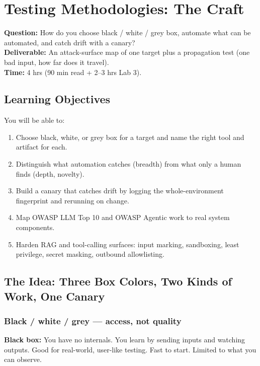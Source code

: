 \chapter{Testing Methodologies: The Craft}
\label{ch:3}

\begin{tcolorbox}[colback=white,colframe=checkblack,title=Chapter 3 at a Glance,fonttitle=\bfseries,sharp corners,boxrule=1pt]
\textbf{Question:} How do you choose black / white / grey box, automate what can be automated, and catch drift with a canary?\\
\textbf{Deliverable:} An attack-surface map of one target plus a propagation test (one bad input, how far does it travel).\\
\textbf{Time:} 4 hrs (90 min read + 2–3 hrs Lab 3).
\end{tcolorbox}

\section{Learning Objectives}
\fbadge
You will be able to:
\begin{enumerate}
\item Choose black, white, or grey box for a target and name the right tool and artifact for each.
\item Distinguish what automation catches (breadth) from what only a human finds (depth, novelty).
\item Build a canary that catches drift by logging the whole-environment fingerprint and rerunning on change.
\item Map OWASP LLM Top 10 and OWASP Agentic work to real system components.
\item Harden RAG and tool-calling surfaces: input marking, sandboxing, least privilege, secret masking, outbound allowlisting.
\end{enumerate}

\section{The Idea: Three Box Colors, Two Kinds of Work, One Canary}
\tierF

\subsection{Black / white / grey — access, not quality}
\textbf{Black box:} You have no internals. You learn by sending inputs and watching outputs. Good for real-world, user-like testing. Fast to start. Limited to what you can observe.

